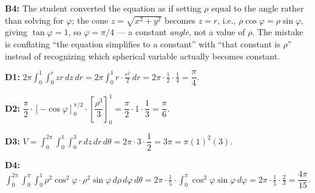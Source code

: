 \documentclass[11pt]{article}
\begin{document}
\textbf{B4:} The student converted the equation as if setting $\rho$ equal to the angle rather than solving for $\varphi$; the cone $z=\sqrt{x^2+y^2}$ becomes $z=r$, i.e., $\rho\cos\varphi=\rho\sin\varphi$, giving $\tan\varphi=1$, so $\varphi=\pi/4$ --- a constant \emph{angle}, not a value of $\rho$. The mistake is conflating ``the equation simplifies to a constant'' with ``that constant is $\rho$'' instead of recognizing which spherical variable actually becomes constant.

\textbf{D1:} $2\pi\int_0^1\int_0^r zr\,dz\,dr = 2\pi\int_0^1 r\cdot\frac{r^2}{2}\,dr = 2\pi\cdot\frac{1}{2}\cdot\frac{1}{4} = \dfrac{\pi}{4}$.

\textbf{D2:} $\dfrac{\pi}{2}\cdot[-\cos\varphi]_0^{\pi/2}\cdot\left[\dfrac{\rho^3}{3}\right]_0^1 = \dfrac{\pi}{2}\cdot 1\cdot\dfrac{1}{3} = \dfrac{\pi}{6}$.

\textbf{D3:} $V = \displaystyle\int_0^{2\pi}\int_0^1\int_0^3 r\,dz\,dr\,d\theta = 2\pi\cdot 3\cdot\dfrac{1}{2} = 3\pi = \pi(1)^2(3)$. \checkmark

\textbf{D4:} $\displaystyle\int_0^{2\pi}\int_0^\pi\int_0^1 \rho^2\cos^2\varphi\cdot\rho^2\sin\varphi\,d\rho\,d\varphi\,d\theta = 2\pi\cdot\frac{1}{5}\cdot\int_0^\pi \cos^2\varphi\sin\varphi\,d\varphi = 2\pi\cdot\frac{1}{5}\cdot\frac{2}{3} = \dfrac{4\pi}{15}$.
\end{document}
